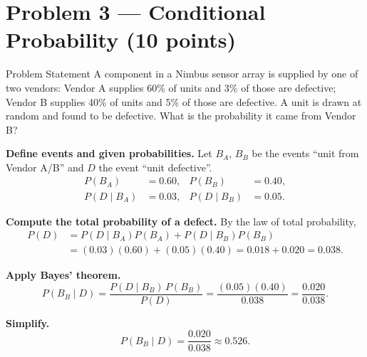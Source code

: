
\section{Problem 3 --- Conditional Probability (10 points)}

\begin{problembox}{Problem Statement}
A component in a Nimbus sensor array is supplied by one of two vendors:
Vendor A supplies 60\% of units and 3\% of those are defective; Vendor B
supplies 40\% of units and 5\% of those are defective. A unit is drawn at
random and found to be defective. What is the probability it came from
Vendor B?
\end{problembox}

\begin{steps}

\item \textbf{Define events and given probabilities.} Let $B_A$, $B_B$ be
the events ``unit from Vendor A/B'' and $D$ the event ``unit defective''.
\begin{align*}
  P(B_A) &= 0.60, & P(B_B) &= 0.40, \\
  P(D \mid B_A) &= 0.03, & P(D \mid B_B) &= 0.05.
\end{align*}


\item \textbf{Compute the total probability of a defect.} By the law of
total probability,
\begin{align*}
  P(D) &= P(D \mid B_A)P(B_A) + P(D \mid B_B)P(B_B) \\
       &= (0.03)(0.60) + (0.05)(0.40) = 0.018 + 0.020 = 0.038.
\end{align*}


\item \textbf{Apply Bayes' theorem.}
\[
  P(B_B \mid D) = \frac{P(D \mid B_B)\,P(B_B)}{P(D)}
    = \frac{(0.05)(0.40)}{0.038} = \frac{0.020}{0.038}.
\]


\item \textbf{Simplify.}
\[
  P(B_B \mid D) = \frac{0.020}{0.038} \approx 0.526.
\]

\end{steps}

